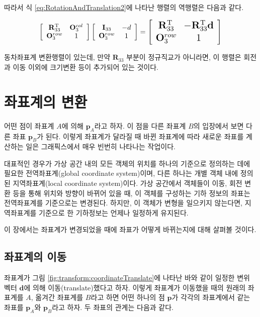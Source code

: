 따라서 식 \ref{eq:RotationAndTranslation2}에 나타난 행렬의 역행렬은 다음과 같다.

\begin{eqnarray}
\label{eq:RotationAndTranslationInverse}
\left [
\begin{array}{cc}
\mathbf R_{33}^{\rm T} & \mathbf O_3^{col} \\
\mathbf O_3^{row} & 1
\end{array}
\right ]
\left [
\begin{array}{cc}
\mathbf I_{33} & \mathbf -d \\
\mathbf O_3^{row} & 1
\end{array}
\right ]
= 
\Large{
\left [
\begin{array}{cc}
\mathbf R_{33}^{\rm T} & - \mathbf R_{33}^{\rm T} \mathbf d \\
\mathbf O_3^{row} & 1
\end{array}
\right ]
}
\end{eqnarray}

동차좌표계 변환행렬이 있는데, 만약 $\mathbf R_{33}$ 부분이 정규직교가 아니라면, 이 행렬은 회전과 이동 이외에 크기변환 등이 추가되어 있는 것이다.

\section{좌표계의 변환}

어떤 점이 좌표계 $A$에 의해 $\mathbf p_A$라고 하자. 이 점을 다른 좌표계 $B$의 입장에서 보면 다른 좌표 $\mathbf p_B$가 된다.
이렇게 좌표계가 달라질 때 바뀐 좌표계에 따라 새로운 좌표를 계산하는 일은 그래픽스에서 매우 빈번히 나타나는 작업이다.


대표적인 경우가 가상 공간 내의 모든 객체의 위치를 하나의 기준으로 정의하는 데에 필요한 전역좌표계(global coordinate system)이며, 
다른 하나는 개별 객체 내에 정의된 지역좌표계(local coordinate system)이다. 
가상 공간에서 객체들이 이동, 회전 변환 등을 통해 위치와 방향이 바뀌어 있을 때, 이 객체를 구성하는 기하 정보의 좌표는 전역좌표계를 기준으로는 변경된다.
하지만, 이 객체가 변형을 일으키지 않는다면, 지역좌표계를 기준으로 한 기하정보는 언제나 일정하게 유지된다.

이 장에서는 좌표계가 변경되었을 때에 좌표가 어떻게 바뀌는지에 대해 살펴볼 것이다.

\subsection{좌표계의 이동}

좌표계가 그림 \ref{fig:transform:coordinateTranslate}에 나타난 바와 같이 일정한 변위 벡터 $\mathbf d$에 의해 이동(translate)했다고 하자.
이렇게 좌표계가 이동했을 때의 원래의 좌표계를 $A$, 옮겨간 좌표계를 $B$라고 하면 
어떤 하나의 점 $\mathbf p$가 각각의 좌표계에서 같는 좌표를 $\mathbf p_A$와 $\mathbf p_B$라고 하자.
두 좌표의 관계는 다음과 같다.


